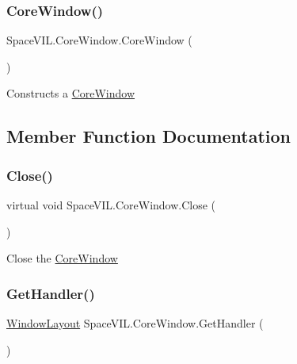\subsubsection{\texorpdfstring{Core\+Window()}{CoreWindow()}}
{\footnotesize\ttfamily Space\+V\+I\+L.\+Core\+Window.\+Core\+Window (\begin{DoxyParamCaption}{ }\end{DoxyParamCaption})}



Constructs a \mbox{\hyperlink{class_space_v_i_l_1_1_core_window}{Core\+Window}} 



\subsection{Member Function Documentation}
\mbox{\label{class_space_v_i_l_1_1_core_window_ab69ce6562a17e23166fedb8f3ce12fc1}} 
\subsubsection{\texorpdfstring{Close()}{Close()}}
{\footnotesize\ttfamily virtual void Space\+V\+I\+L.\+Core\+Window.\+Close (\begin{DoxyParamCaption}{ }\end{DoxyParamCaption})\hspace{0.3cm}{\ttfamily [virtual]}}



Close the \mbox{\hyperlink{class_space_v_i_l_1_1_core_window}{Core\+Window}} 

\mbox{\label{class_space_v_i_l_1_1_core_window_ac4c8503aa1fdd2ed2f0fd3ff278f8bee}} 
\subsubsection{\texorpdfstring{Get\+Handler()}{GetHandler()}}
{\footnotesize\ttfamily \mbox{\hyperlink{class_space_v_i_l_1_1_window_layout}{Window\+Layout}} Space\+V\+I\+L.\+Core\+Window.\+Get\+Handler (\begin{DoxyParamCaption}{ }\end{DoxyParamCaption})}



